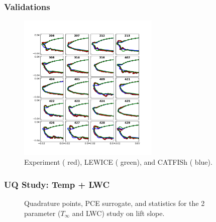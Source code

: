 \documentclass[9pt]{beamer}
\begin{document}
\begin{frame}
\frametitle{Validations}
\label{sec-3-6}

\vspace*{-0.5cm}
\begin{figure}[ht]
  \centering
  \includegraphics[trim=0.625in 0.75in 0.83in 0.8in,clip,width=0.6\textwidth]{IceShapeValidations.png}
  \caption{Experiment ({\color{red} red}), LEWICE ({\color{green} green}), and CATFISh ({\color{blue} blue}).}
\end{figure}
\end{frame}
\begin{frame}
\frametitle{UQ Study: Temp + LWC}
\label{sec-3-7}

\begin{figure}[ht]
\centering
{}
\caption{Quadrature points, PCE surrogate, and statistics for the 2 parameter ($T_{\infty}$ and LWC) study on lift slope.}
\end{figure}
\end{frame}
\end{document}
